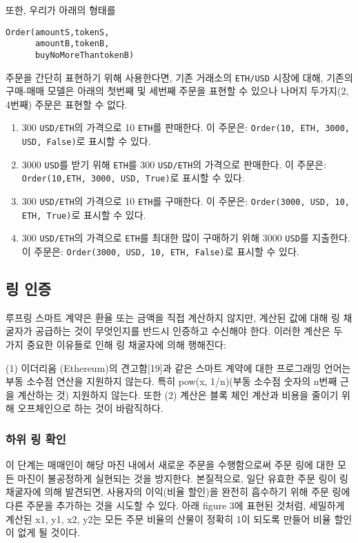 \documentclass{article}
\begin{document}
\begin{multicols}{2}
또한, 우리가 아래의 형태를

\begin{verbatim}
Order(amountS,tokenS,
      amountB,tokenB,
      buyNoMoreThantokenB)
\end{verbatim}

주문을 간단히 표현하기 위해 사용한다면, 기존 거래소의 \verb|ETH/USD| 시장에 대해, 기존의 구매-매매 모델은 아래의 첫번째 및 세번째 주문을 표현할 수 있으나 나머지 두가지(2, 4번째) 주문은 표현할 수 없다.

\begin{enumerate}
	\item 300 \verb|USD/ETH|의 가격으로 10 \verb|ETH|를 판매한다. 이 주문은: \verb|Order(10, ETH, 3000, USD, False)|로 표시할 수 있다.
 
	\item 3000 \verb|USD|를 받기 위해 \verb|ETH|를 300 \verb|USD/ETH|의 가격으로 판매한다. 이 주문은: \verb|Order(10,ETH, 3000, USD, True)|로 표시할 수 있다.
	
	\item 300 \verb|USD/ETH|의 가격으로 10 \verb|ETH|를 구매한다. 이 주문은: \verb|Order(3000, USD, 10, ETH, True)|로 표시할 수 있다.
	
	\item 300 \verb|USD/ETH|의 가격으로 \verb|ETH|를 최대한 많이 구매하기 위해 3000 \verb|USD|를 지출한다. 이 주문은: \verb|Order(3000, USD, 10, ETH, False)|로 표시할 수 있다.
	
\end{enumerate}



\subsection{링 인증\label{sec:ring_verification}}

루프링 스마트 계약은 환율 또는 금액을 직접 계산하지 않지만, 계산된 값에 대해 링 채굴자가 공급하는 것이 무엇인지를 반드시 인증하고 수신해야 한다. 이러한 계산은 두 가지 중요한 이유들로 인해 링 채굴자에 의해 행해진다:

(1) 이더리움 (Ethereum)의 견고함[19]과 같은 스마트 계약에 대한 프로그래밍 언어는 부동 소수점 연산을 지원하지 않는다. 특히 pow(x, 1/n)(부동 소수점 숫자의 n번째 근을 계산하는 것) 지원하지 않는다. 또한 (2) 계산은 블록 체인 계산과 비용을 줄이기 위해 오프체인으로 하는 것이 바람직하다.

\subsubsection{하위 링 확인\label{sec:sub_ring_check}}
이 단계는 매매인이 해당 마진 내에서 새로운 주문을 수행함으로써 주문 링에 대한 모든 마진이 불공정하게 실현되는 것을 방지한다. 본질적으로, 일단 유효한 주문 링이 링 채굴자에 의해 발견되면, 사용자의 이익(비율 할인)을 완전히 흡수하기 위해 주문 링에 다른 주문을 추가하는 것을 시도할 수 있다. 아래 figure 3에 표현된 것처럼, 세밀하게 계산된 x1, y1, x2, y2는 모든 주문 비율의 산물이 정확히 1이 되도록 만들어 비율 할인이 없게 될 것이다.


\end{multicols}
\end{document}
